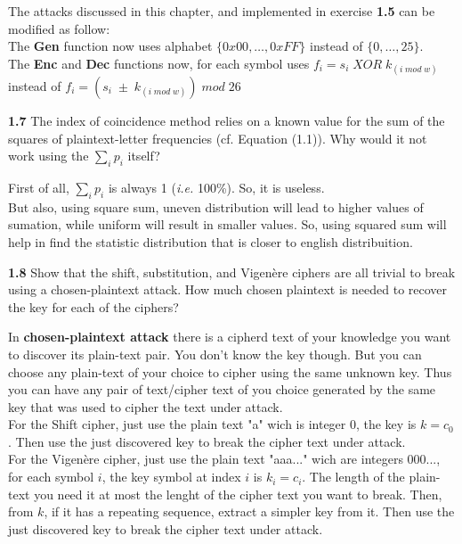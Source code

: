 The attacks discussed in this chapter, and implemented in exercise \textbf{1.5} can be modified as follow:\\

The \textbf{Gen} function now uses alphabet \(\{0x00, \dots, 0xFF\}\) instead of \(\{0, \dots, 25\}\).\\

The \textbf{Enc} and \textbf{Dec}  functions now, for each symbol uses \(f_i = s_i \; XOR \; k_{(i \; mod \; w)}\) instead of   \(f_i = (s_i \; \pm \; k_{(i \; mod \; w)}) \; mod \; 26\)

\vspace{1em}
\noindent
\textbf{1.7} \hspace{1em} The index of coincidence method relies on a known value for the sum
of the squares of plaintext-letter frequencies (cf. Equation (1.1)). Why would it not work using the \( \sum_{i} p_i \) itself?
\vspace{1em}

First of all, \( \sum_{i} p_i \) is always 1 (\textit{i.e.} 100\%). So, it is useless.\\

But also, using square sum, uneven distribution will lead to higher values of sumation, while uniform will result in smaller values. So, using squared sum will help in find the statistic distribution that is closer to english distribuition.

\vspace{1em}
\noindent
\textbf{1.8} \hspace{1em} Show that the shift, substitution, and Vigenère ciphers are all trivial to break using a chosen-plaintext attack. How much chosen plaintext is needed to recover the key for each of the ciphers?
\vspace{1em}

In \textbf{chosen-plaintext attack} there is a cipherd text of your knowledge you want to discover its plain-text pair. You don't know the key though. But you can choose any plain-text of your choice to cipher using the same unknown key. Thus you can have any pair of text/cipher text of you choice generated by the same key that was used to cipher the text under attack.\\

For the Shift cipher, just use the plain text "a"  wich is integer 0, the key is \(k = c_0\). Then use the just discovered key to break the cipher text under attack.\\

For the Vigenère cipher, just use the plain text "aaa..."  wich are integers 000..., for each symbol \(i\), the key symbol at index \(i\) is \(k_i = c_i \). The length of the plain-text you need it at most the lenght of the cipher text you want to break. Then, from \(k\), if it has a repeating sequence, extract a simpler key from it. Then use the just discovered key to break the cipher text under attack.

